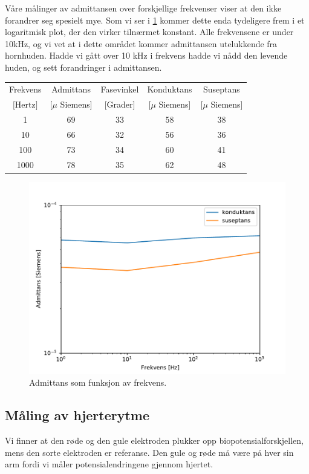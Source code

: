 \documentclass[11pt,norsk]{article}
\begin{document}
Våre målinger av admittansen over forskjellige frekvenser viser at den ikke forandrer seg spesielt mye. Som vi ser i \ref{fig:admittance} kommer dette enda tydeligere frem i et logaritmisk plot, der den virker tilnærmet konstant. Alle frekvensene er under 10kHz, og vi vet at i dette området kommer admittansen utelukkende fra hornhuden. Hadde vi gått over 10 kHz i frekvens hadde vi nådd den levende huden, og sett forandringer i admittansen. 
\\

\begin{center}
\begin{tabular}{| c | c | c | c | c |}
\hline
Frekvens & Admittans & Fasevinkel & Konduktans & Suseptans \\
$\text{[Hertz]}$ & [$\mu$ Siemens] & [Grader] & [$\mu$ Siemens] & [$\mu$ Siemens] \\
\hline
1 	& 69 & 33 & 58    & 38 \\
10 	& 66 & 32 & 56    & 36 \\
100 	& 73 & 34 & 60    & 41 \\
1000 	& 78 & 35 & 62    & 48 \\
\hline
\end{tabular}
\end{center}

\begin{figure}[H]
\includegraphics[width = \textwidth]{fig/admittance.pdf}
\caption{Admittans som funksjon av frekvens.}
\label{fig:admittance}
\end{figure}


\subsection{Måling av hjerterytme}
Vi finner at den røde og den gule elektroden plukker opp biopotensialforskjellen, mens den sorte elektroden er referanse. Den gule og røde må være på hver sin arm fordi vi måler potensialendringene gjennom hjertet. 
\end{document}
